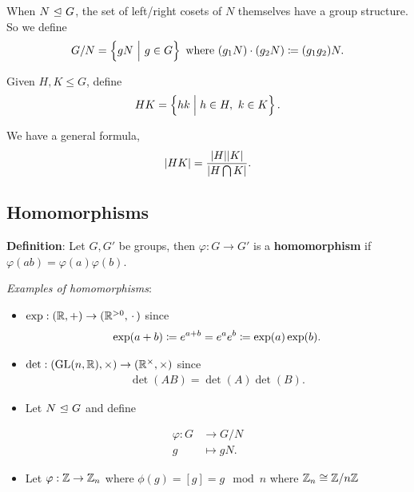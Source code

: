 When \(N {~\trianglelefteq~} G\), the set of left/right cosets of \(N\) themselves
have a group structure. So we define
\begin{align*}
G/N = \left\{{gN {~\mathrel{\Big|}~} g\in G}\right\}
\text{ where }
(g_1 N)\cdot (g_2 N) \coloneqq (g_1 g_2) N
.\end{align*}

Given \(H, K \leq G\), define
\begin{align*}
HK = \left\{{hk \mathrel{\Big|} h\in H, ~k\in K}\right\}
.\end{align*}

We have a general formula,
\begin{align*}
{\left\lvert {HK} \right\rvert} = \frac{{\left\lvert {H} \right\rvert} {\left\lvert {K} \right\rvert}}{{\left\lvert {H \bigcap K} \right\rvert}}.
\end{align*}

\hypertarget{homomorphisms}{%
\subsection{Homomorphisms}\label{homomorphisms}}

\textbf{Definition}: Let \(G,G'\) be groups, then \(\varphi: G \to G'\)
is a \textbf{homomorphism} if \(\varphi(ab) = \varphi(a) \varphi(b)\).

\emph{Examples of homomorphisms}:

\begin{itemize}
\item
  \(\exp: ({\mathbb{R}}, +) \to ({\mathbb{R}}^{> 0}, {\,\cdot\,})\) since
  \begin{align*}
  \exp(a+b) \coloneqq e^{a+b} = e^a e^b \coloneqq \exp(a) \exp(b)
  .\end{align*}
\item
  \(\det: ({\text{GL}}(n, {\mathbb{R}}), \times) \to ({\mathbb{R}}^{\times}, \times)\) since
  \begin{align*}\det(AB) = \det(A) \det(B).\end{align*}
\item
  Let \(N {~\trianglelefteq~} G\) and define
\end{itemize}

\begin{align*}
\varphi: G &\to G/N \\
g &\mapsto gN
.\end{align*}

\begin{itemize}
\tightlist
\item
  Let \(\varphi: {\mathbb{Z}} \to {\mathbb{Z}}_n\) where \(\phi(g) = [g] = g \mod n\)
  where \({\mathbb{Z}}_n \cong {\mathbb{Z}}/n{\mathbb{Z}}\)
\end{itemize}

